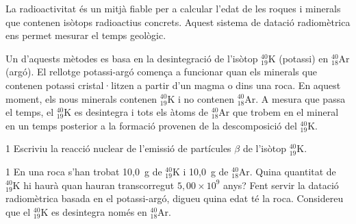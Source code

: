 La radioactivitat és un mitjà fiable per a calcular l'edat de les roques i minerals que contenen isòtops radioactius concrets. Aquest sistema de datació radiomètrica ens permet mesurar el temps geològic.

Un d'aquests mètodes es basa en la desintegració de l'isòtop ${}^{40}_{19}\mathrm{K}$ (potassi) en ${}^{40}_{18}\mathrm{Ar}$ (argó). El rellotge potassi-argó comença a funcionar quan els minerals que contenen potassi cristal·litzen a partir d'un magma o dins una roca. En aquest moment, els nous minerals contenen ${}^{40}_{19}\mathrm{K}$ i no contenen ${}^{40}_{18}\mathrm{Ar}$. A mesura que passa el temps, el ${}^{40}_{19}\mathrm{K}$ es desintegra i tots els àtoms de ${}^{40}_{18}\mathrm{Ar}$ que trobem en el mineral en un temps posterior a la formació provenen de la descomposició del ${}^{40}_{19}\mathrm{K}$.

\begin{apartat}{1}
Escriviu la reacció nuclear de l'emissió de partícules $\beta$ de l'isòtop ${}^{40}_{19}\mathrm{K}$.
\end{apartat}

\begin{apartat}{1}
En una roca s'han trobat 10,0~g de ${}^{40}_{19}\mathrm{K}$ i 10,0~g de ${}^{40}_{18}\mathrm{Ar}$. Quina quantitat de ${}^{40}_{19}\mathrm{K}$ hi haurà quan hauran transcorregut $5,00\times 10^{9}$ anys? Fent servir la datació radiomètrica basada en el potassi-argó, digueu quina edat té la roca. Considereu que el ${}^{40}_{19}\mathrm{K}$ es desintegra només en ${}^{40}_{18}\mathrm{Ar}$.
\end{apartat}

